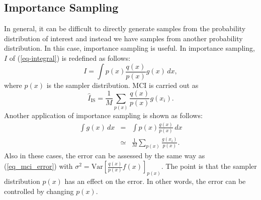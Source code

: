\subsection{Importance Sampling}
In general, it can be difficult to
directly generate samples from the probability distribution of interest
and instead we have samples from another probability distribution.
In this case, importance sampling is useful.
In importance sampling,
$I$ of (\ref{eq-integral}) is redefined as follows:
\begin{equation}
 I=\int p(x) \frac{q(x)}{p(x)}g(x) \, dx,
\end{equation}
where $p(x)$ is the sampler distribution.
MCI is carried out as
\begin{equation}
 \hat I_{\mathrm{IS}} = \frac{1}{M} \sum_{p(x)} \frac{q(x)}{p(x)} g(x_i).
\end{equation}
Another application of importance sampling is shown as follows:
\begin{eqnarray}
 \int g(x) \, dx &=&\int p(x) \frac{g(x)}{p(x)} \, dx \\
                   &\simeq&\frac{1}{M} \sum_{p(x)} \frac{g(x_i)}{p(x)}.
\end{eqnarray}
Also in these cases,
the error can be assessed by the same way as (\ref{eq_mci_error})
with $\sigma^2=\mathrm{Var}[\frac{q(x)}{p(x)}f(x)]_{p(x)}$.
The point is that the sampler distribution $p(x)$ has an effect on
the error.
In other words, the error can be controlled by changing $p(x)$.


